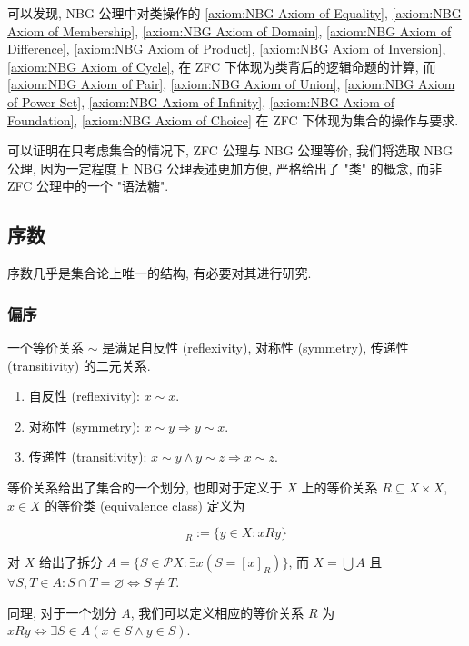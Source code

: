 可以发现, NBG 公理中对类操作的 \ref{axiom:NBG Axiom of Equality}, \ref{axiom:NBG Axiom of Membership},
\ref{axiom:NBG Axiom of Domain}, \ref{axiom:NBG Axiom of Difference}, \ref{axiom:NBG Axiom of Product},
\ref{axiom:NBG Axiom of Inversion}, \ref{axiom:NBG Axiom of Cycle}, 在 ZFC 下体现为类背后的逻辑命题的计算,
而 \ref{axiom:NBG Axiom of Pair}, \ref{axiom:NBG Axiom of Union}, \ref{axiom:NBG Axiom of Power Set},
\ref{axiom:NBG Axiom of Infinity}, \ref{axiom:NBG Axiom of Foundation}, \ref{axiom:NBG Axiom of Choice}
在 ZFC 下体现为集合的操作与要求.

可以证明在只考虑集合的情况下, ZFC 公理与 NBG 公理等价, 我们将选取 NBG 公理, 因为一定程度上 NBG 公理表述更加方便, 严格给出了 "类" 的概念, 而非 ZFC 公理中的一个 "语法糖".

\subsection{序数}

序数几乎是集合论上唯一的结构, 有必要对其进行研究.

\subsubsection{偏序}

\begin{definition}
    一个等价关系 \(\sim\) 是满足自反性 (reflexivity), 对称性 (symmetry), 传递性 (transitivity) 的二元关系.
    \begin{enumerate}
        \item 自反性 (reflexivity): \(x \sim x\).
        \item 对称性 (symmetry): \(x \sim y \Rightarrow y \sim x\).
        \item 传递性 (transitivity): \(x \sim y \land y \sim z \Rightarrow x \sim z\).
    \end{enumerate}


    等价关系给出了集合的一个划分, 也即对于定义于 \(X\) 上的等价关系 \(R \subseteq X \times X\), \(x \in X\) 的等价类 (equivalence class) 定义为

    \begin{equation}
        [x]_R := \{y \in X : x R y\}
    \end{equation}

    对 \(X\) 给出了拆分 \(A = \{S \in \mathcal{P} X : \exists x (S = [x]_R)\}\),
    而 \(X = \bigcup A\) 且 \(\forall S, T \in A : S \cap T = \varnothing \Leftrightarrow S \neq T\).

    同理, 对于一个划分 \(A\), 我们可以定义相应的等价关系 \(R\) 为 \(x R y \Leftrightarrow \exists S \in A (x \in S \land y \in S)\).
\end{definition}



